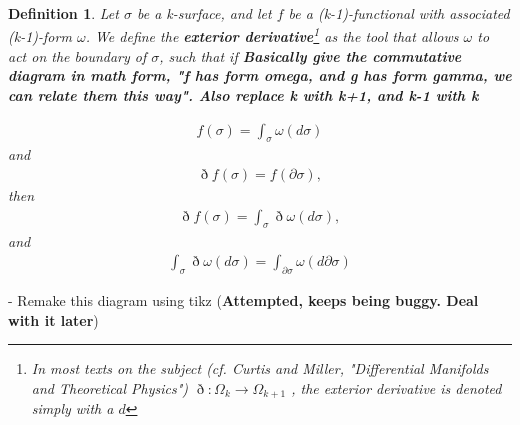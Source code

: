 \documentclass{book}
\newtheorem{defn}[equation]{Definition}
\begin{document}
\begin{defn}
	Let $\sigma$ be a k-surface, and let $f$ be a (k-1)-functional with associated (k-1)-form $\omega$. We define the \textbf{exterior derivative}\footnote{In most texts on the subject (cf. Curtis and Miller, "Differential Manifolds and Theoretical Physics") $\eth : \Omega_k \to \Omega_{k+1}$ , the exterior derivative is denoted simply with a $d$} as the tool that allows $\omega$ to act on the boundary of $\sigma$, such that if \textbf{Basically give the commutative diagram in math form, "f has form omega, and g has form gamma, we can relate them this way". Also replace k with k+1, and k-1 with k}
	
	\begin{gather}f(\sigma) = \int_{\sigma}\omega(d\sigma)\end{gather} and \begin{gather} \eth f(\sigma) = f(\partial\sigma), \end{gather}
	then
	\begin{gather} \eth f(\sigma) = \int_{\sigma} \eth\omega(d\sigma),\end{gather} 
	and
	\begin{gather} \int_\sigma \eth\omega(d\sigma) = \int_{\partial\sigma} \omega(d\partial\sigma)\end{gather}
\end{defn}




 
 
 
 
 
 


- Remake this diagram using tikz (\textbf{Attempted, keeps being buggy. Deal with it later})
\end{document}
